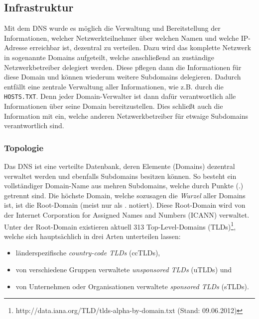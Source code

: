 \documentclass[a4paper, 12pt, BCOR10mm, DIV12, toc=bibliography, toc=listof, german]{scrbook}
\begin{document}

			\subsection{Infrastruktur} %
			\label{sub:infrastruktur}
			
			Mit dem DNS wurde es möglich die Verwaltung und Bereitstellung der Informationen, welcher
			Netzwerkteilnehmer über welchen Namen und welche IP-Adresse erreichbar ist, dezentral zu
			verteilen. Dazu wird das komplette Netzwerk in sogenannte Domains aufgeteilt, welche
			anschließend an zuständige Netzwerkbetreiber delegiert werden. Diese pflegen dann die
			Informationen für diese Domain und können wiederum weitere Subdomains delegieren. Dadurch
			entfällt eine zentrale Verwaltung  aller Informationen, wie z.B. durch die \texttt{HOSTS.TXT}.
			Denn jeder Domain-Verwalter ist dann dafür verantwortlich alle Informationen über seine Domain
			bereitzustellen. Dies schließt auch die Information mit ein, welche anderen Netzwerkbetreiber
			für etwaige Subdomains verantwortlich sind.

				\subsubsection*{Topologie} %
				
				Das DNS ist eine verteilte Datenbank, deren Elemente (Domains) dezentral  verwaltet werden
				und ebenfalls Subdomains besitzen können. So besteht ein vollständiger Domain-Name aus
				mehren Subdomains, welche durch Punkte (.) getrennt sind. Die höchste Domain, welche
				sozusagen die \textit{Wurzel} aller Domains ist, ist die Root-Domain (meist nur als
				\glqq{}.\grqq{} notiert).
				Diese Root-Domain wird von der Internet Corporation for Assigned Names and Numbers (ICANN)
				verwaltet. Unter der Root-Domain existieren aktuell 313
				Top-Level-Domains (TLDs)\footnote{http://data.iana.org/TLD/tlds-alpha-by-domain.txt (Stand:
				09.06.2012)}, welche sich hauptsächlich in drei Arten unterteilen lassen:

					\begin{itemize}
						\item länderspezifische \textit{country-code TLDs} (ccTLDs),
						\item von verschiedene Gruppen verwaltete \textit{unsponsored TLDs} (uTLDs) und
						\item von Unternehmen oder Organisationen verwaltete \textit{sponsored TLDs}
							(sTLDs).
					\end{itemize}
					
\end{document}
